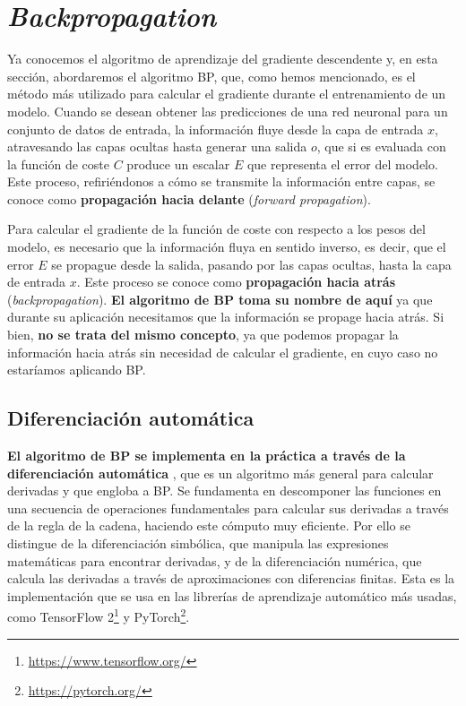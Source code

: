 \section{\textit{Backpropagation}}
Ya conocemos el algoritmo de aprendizaje del gradiente descendente y, en esta sección, abordaremos el algoritmo BP, que, como hemos mencionado, es el método más utilizado para calcular el gradiente durante el entrenamiento de un modelo. Cuando se desean obtener las predicciones de una red neuronal para un conjunto de datos de entrada, la información fluye desde la capa de entrada $x$, atravesando las capas ocultas hasta generar una salida $o$, que si es evaluada con la función de coste $C$ produce un escalar $E$ que representa el error del modelo. Este proceso, refiriéndonos a cómo se transmite la información entre capas, se conoce como \textbf{propagación hacia delante} (\textit{forward propagation}).

Para calcular el gradiente de la función de coste con respecto a los pesos del modelo, es necesario que la información fluya en sentido inverso, es decir, que el error $E$ se propague desde la salida, pasando por las capas ocultas, hasta la capa de entrada $x$. Este proceso se conoce como \textbf{propagación hacia atrás} (\textit{backpropagation}). \textbf{El algoritmo de BP toma su nombre de aquí} ya que durante su aplicación necesitamos que la información se propage hacia atrás. Si bien, \textbf{no se trata del mismo concepto}, ya que podemos propagar la información hacia atrás sin necesidad de calcular el gradiente, en cuyo caso no estaríamos aplicando BP.






\subsection{Diferenciación automática}

\textbf{El algoritmo de BP se implementa en la práctica a través de la diferenciación automática} \cite{AutomaticDiff}, que es un algoritmo más general para calcular derivadas y que engloba a BP. Se fundamenta en descomponer las funciones en una secuencia de operaciones fundamentales para calcular sus derivadas a través de la regla de la cadena, haciendo este cómputo muy eficiente. Por ello se distingue de la diferenciación simbólica, que manipula las expresiones matemáticas para encontrar derivadas, y de la diferenciación numérica, que calcula las derivadas a través de aproximaciones con diferencias finitas. Esta es la implementación que se usa en las librerías de aprendizaje automático más usadas, como TensorFlow 2\footnote{\url{https://www.tensorflow.org/}} y PyTorch\footnote{\url{https://pytorch.org/}}.

